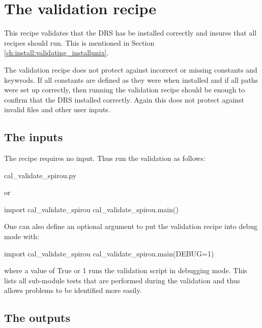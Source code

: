 \clearpage
\newpage
\section{The validation recipe}
\label{ch:the_recipes:cal_validate_spirou}

This recipe validates that the DRS has be installed correctly and insures that all recipes should run. This is mentioned in Section \ref{ch:install:validating_installunix}.
\begin{note}
The validation recipe does not protect against incorrect or missing constants and keywrods. If all constants are defined as they were when installed and if all paths were set up correctly, then running the validation recipe should be enough to confirm that the DRS installed correctly. Again this does not protect against invalid files and other user inputs.
\end{note}

\subsection{The inputs}
The \calvalidate recipe requires no input. Thus run the validation as follows:
\begin{cmdbox}
cal_validate_spirou.py
\end{cmdbox}
\noindent or
\begin{pythonbox}
import cal_validate_spirou
cal_validate_spirou.main()
\end{pythonbox}
\noindent One can also define an optional argument to put the validation recipe into debug mode with:
\begin{pythonbox}
import cal_validate_spirou
cal_validate_spirou.main(DEBUG=1)
\end{pythonbox}
\noindent where a value of True or 1 runs the validation script in debugging mode. This lists all sub-module tests that are performed during the validation and thus allows problems to be identified more easily.

\subsection{The outputs}

